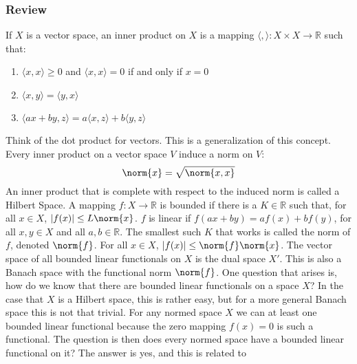 \documentclass[crop=false,class=article,oneside]{standalone}
\begin{document}
        \subsubsection{Review}
            If $X$ is a vector space, an inner product on
            $X$ is a mapping
            $\langle,\rangle:X\times{X}\rightarrow\mathbb{R}$
            such that:
            \begin{enumerate}
                \item $\langle{x,x}\rangle\geq{0}$ and
                      $\langle{x,x}\rangle=0$ if and only if
                      $x=0$
                \item $\langle{x,y}\rangle=\langle{y,x}\rangle$
                \item $\langle{ax+by,z}\rangle%
                       =a\langle{x,z}\rangle+b\langle{y,z}\rangle$
            \end{enumerate}
            Think of the dot product for vectors. This is a
            generalization of this concept. Every inner product
            on a vector space $V$ induce a norm on $V$:
            \begin{equation*}
                \norm{x}=\sqrt{\norm{x,x}}
            \end{equation*}
            An inner product that is complete with respect to
            the induced norm is called a Hilbert Space. A mapping
            $f:X\rightarrow\mathbb{R}$ is bounded if there is a
            $K\in\mathbb{R}$ such that, for all $x\in{X}$,
            $|f(x)|\leq{L\norm{x}}$. $f$ is linear if
            $f(ax+by)=af(x)+bf(y)$, for all $x,y\in{X}$ and all
            $a,b\in\mathbb{R}$. The smallest such $K$ that works
            is called the norm of $f$, denoted $\norm{f}$. For
            all $x\in{X}$, $|f(x)|\leq\norm{f}\norm{x}$. The
            vector space of all bounded linear functionals on
            $X$ is the dual space $X'$. This is also a Banach
            space with the functional norm $\norm{f}$. One
            question that arises is, how do we know that there
            are bounded linear functionals on a space $X$? In
            the case that $X$ is a Hilbert space, this is rather
            easy, but for a more general Banach space this is not
            that trivial. For any normed space $X$ we can at least
            one bounded linear functional because the zero mapping
            $f(x)=0$ is such a functional. The question is then
            does every normed space have a bounded linear functional
            on it? The answer is yes, and this is related to
\end{document}
